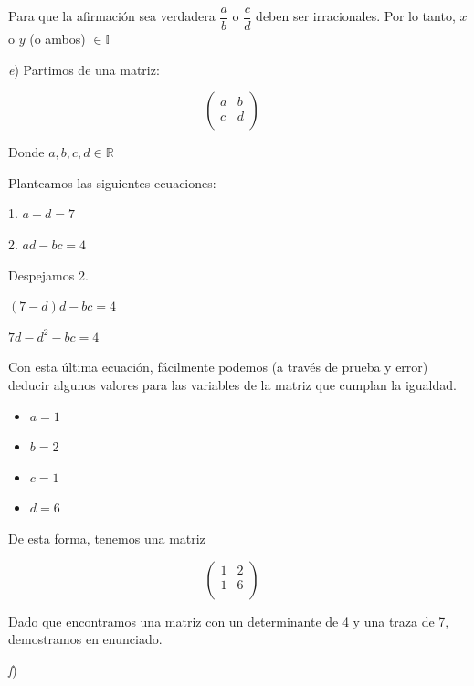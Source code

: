 \documentclass[11pt,a4paper]{article}
\begin{document}
\begin{enumerate}
Para que la afirmación sea verdadera $\dfrac{a}{b}$ o $\dfrac{c}{d}$ deben ser irracionales. Por lo tanto, $x$ o $y$ (o ambos) $\in \mathbb{I}$

\vspace{0.5cm}

\textit{e}) Partimos de una matriz:


$$
\begin{pmatrix} 
a & b \\
c & d \\
\end{pmatrix}
\quad
$$

Donde $a, b, c, d \in \mathbb{R}$

Planteamos las siguientes ecuaciones:

\begin{center}

1. $a + d = 7$

2. $ad - bc = 4$

\end{center}

Despejamos 2.

\begin{center}

$(7-d)d - bc = 4$

$7d-d^2-bc = 4$

\end{center}

Con esta última ecuación, fácilmente podemos (a través de prueba y error) deducir algunos valores para las variables de la matriz que cumplan la igualdad.


\begin{itemize}
\item $a = 1$
\item $b = 2$
\item $c = 1$
\item $d = 6$
\end{itemize}

De esta forma, tenemos una matriz

$$
\begin{pmatrix} 
1 & 2 \\
1 & 6 \\
\end{pmatrix}
\quad
$$

Dado que encontramos una matriz con un determinante de 4 y una traza de 7, demostramos en enunciado.

\vspace{0.5cm}

\textit{f}) 


\end{enumerate}
\end{document}
